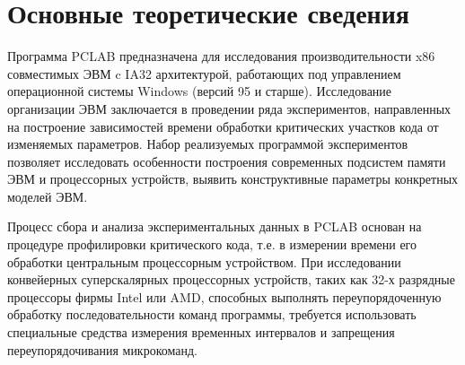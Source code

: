 \chapter*{Основные теоретические сведения}
Программа PCLAB предназначена для исследования производительности x86 совместимых ЭВМ c IA32 архитектурой,
работающих под управлением операционной системы Windows (версий 95 и старше). Исследование организации ЭВМ
заключается в проведении ряда экспериментов, направленных на построение зависимостей времени обработки критических
участков кода от изменяемых параметров. Набор реализуемых программой экспериментов позволяет исследовать
особенности построения современных подсистем памяти ЭВМ и процессорных устройств, выявить конструктивные параметры конкретных моделей ЭВМ. 

Процесс сбора и анализа экспериментальных данных в PCLAB основан на процедуре профилировки критического кода,
т.е. в измерении времени его обработки центральным процессорным устройством. При исследовании
конвейерных суперскалярных процессорных устройств, таких как 32-х разрядные процессоры фирмы Intel или AMD,
способных выполнять переупорядоченную обработку последовательности команд программы, требуется использовать
специальные средства измерения временных интервалов и запрещения переупорядочивания микрокоманд. 
